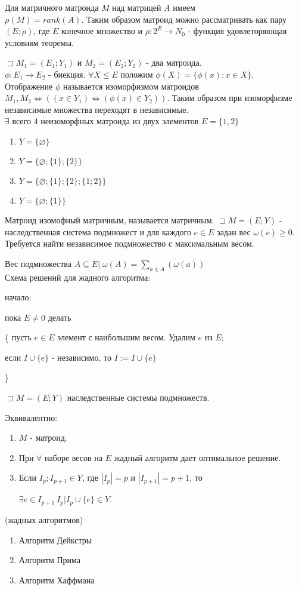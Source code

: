 \note Для матричного матроида $M$ над матрицей $A$ имеем \\ $\rho(M) = rank(A)$. Таким образом матроид можно рассматривать как пару $(E;\rho)$, где $E$ конечное множество и $\rho:2^E \rightarrow N_0$ - функция удовлеторяющая условиям теоремы.

\opr $\sqsupset M_1 = (E_1;Y_1)$ и $ M_2 = (E_2;Y_2)$ - два матроида. \\$\phi : E_1 \rightarrow E_2$ - биекция. $\forall X \leqslant E$ положим $\phi(X) = \{\phi(x) : x\in X\}$. \\Отображение $\phi$ называется изоморфизмом матроидов \\ $M_1,M_2 \Leftrightarrow ((x\in Y_1) \Leftrightarrow (\phi(x) \in Y_2))$. Таким образом при изоморфизме независимые множества переходят в независимые. \\

\example $ \exists $ всего 4 неизоморфных матроида из двух элементов $E=\{1,2\}$
\begin{enumerate}
\item $Y = \{\varnothing\}$
\item $Y = \{ \varnothing ; \{ 1 \} ; \{ 2 \} \}$
\item $Y = \{ \varnothing ; \{ 1 \} ; \{ 2 \} ; \{ 1 ; 2 \} \}$
\item $Y = \{ \varnothing ; \{ 1 \} \} $
\end{enumerate}

\note Матроид изомофный матричным, называется матричным.
$ \sqsupset M = (E;Y)$ - наследственная система подмножест и для каждого $e\in E$ задан вес $\omega(e) \geqslant 0$. Требуется найти независимое подмножество с максимальным весом.\par
Вес подмножества $A\subseteq E |\; \omega(A) = \sum\limits_{a\in A}(\omega(a))$ \\

Схема решений для жадного алгоритма:\par
\quad начало:\par
\quad пока $E \neq 0$ делать \par
\qquad \{ пусть $e\in E $ элемент с наибольшим весом. Удалим $e$ из $E$;\par
\qquad если $I \cup \{ e \} $ - независимо, то $I := I \cup \{ e \} $\par
\qquad \}

\utv $\sqsupset M = (E;Y) $ наследственные системы подмножеств.\\ \par
\quad Эквивалентно:
\begin{enumerate}
\item $M$ - матроид.
\item При $\forall$ наборе весов на $E$ жадный алгоритм дает оптимальное решение.
\item Если $I_p;I_{p+1} \in Y$, где $|I_p| = p$ и $|I_{p+1}| = p + 1$, то \par $\exists e\in I_{p+1}\ I_p | I_p \cup \{ e \} \in Y $.\\
\end{enumerate}

\example(жадных алгоритмов)\par
 \begin{enumerate}
 \item Алгоритм Дейкстры
 \item Алгоритм Прима
 \item Алгоритм Хаффмана
 \end{enumerate}
